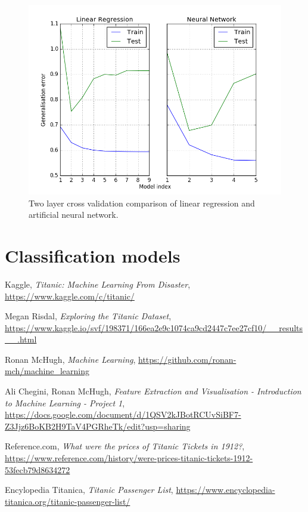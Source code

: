 \documentclass[a4paper]{scrartcl}
\begin{document}
\begin{figure}
  \includegraphics[scale=.3]{graphs/regr_vs_neural.png}
  \centering
  \caption{Two layer cross validation comparison of linear regression and artificial neural network.}
  \label{fig:regr_vs_neural}
\end{figure}

\section{Classification models}

\begin{thebibliography}{9}

  Kaggle,
  \emph{Titanic: Machine Learning From Disaster},
  {\url{https://www.kaggle.com/c/titanic/}}
 
  Megan Risdal,
  \emph{Exploring the Titanic Dataset},
  {\url{https://www.kaggle.io/svf/198371/166ea2e9c1074ca9cd2447c7ee27cf10/__results__.html}}
  
  Ronan McHugh,
  \emph{Machine Learning},
  {\url{https://github.com/ronan-mch/machine_learning}}
  
  Ali Chegini,
  Ronan McHugh,
  \emph{Feature Extraction and Visualisation - Introduction to Machine Learning - Project 1},
  {\url{https://docs.google.com/document/d/1QSV2kJBotRCUvSiBF7-Z3Jjz6BoKB2H9TaV4PGRheTk/edit?usp=sharing}}
  
  Reference.com,
  \emph{What were the prices of Titanic Tickets in 1912?},
  {\url{https://www.reference.com/history/were-prices-titanic-tickets-1912-53fecb79d8634272}}
  
  Encylopedia Titanica,
  \emph{Titanic Passenger List},
  {\url{https://www.encyclopedia-titanica.org/titanic-passenger-list/}}
 


\end{thebibliography}
\end{document}
